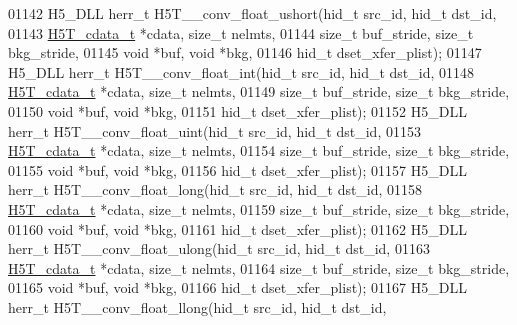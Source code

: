 \begin{DoxyCode}
01142 H5\_DLL herr\_t H5T\_\_conv\_float\_ushort(hid\_t src\_id, hid\_t dst\_id,
01143                      \hyperlink{struct_h5_t__cdata__t}{H5T\_cdata\_t} *cdata, \textcolor{keywordtype}{size\_t} nelmts,
01144                      \textcolor{keywordtype}{size\_t} buf\_stride, \textcolor{keywordtype}{size\_t} bkg\_stride,
01145                                      \textcolor{keywordtype}{void} *buf, \textcolor{keywordtype}{void} *bkg,
01146                                      hid\_t dset\_xfer\_plist);
01147 H5\_DLL herr\_t H5T\_\_conv\_float\_int(hid\_t src\_id, hid\_t dst\_id,
01148                      \hyperlink{struct_h5_t__cdata__t}{H5T\_cdata\_t} *cdata, \textcolor{keywordtype}{size\_t} nelmts,
01149                      \textcolor{keywordtype}{size\_t} buf\_stride, \textcolor{keywordtype}{size\_t} bkg\_stride,
01150                                      \textcolor{keywordtype}{void} *buf, \textcolor{keywordtype}{void} *bkg,
01151                                      hid\_t dset\_xfer\_plist);
01152 H5\_DLL herr\_t H5T\_\_conv\_float\_uint(hid\_t src\_id, hid\_t dst\_id,
01153                      \hyperlink{struct_h5_t__cdata__t}{H5T\_cdata\_t} *cdata, \textcolor{keywordtype}{size\_t} nelmts,
01154                      \textcolor{keywordtype}{size\_t} buf\_stride, \textcolor{keywordtype}{size\_t} bkg\_stride,
01155                                      \textcolor{keywordtype}{void} *buf, \textcolor{keywordtype}{void} *bkg,
01156                                      hid\_t dset\_xfer\_plist);
01157 H5\_DLL herr\_t H5T\_\_conv\_float\_long(hid\_t src\_id, hid\_t dst\_id,
01158                      \hyperlink{struct_h5_t__cdata__t}{H5T\_cdata\_t} *cdata, \textcolor{keywordtype}{size\_t} nelmts,
01159                      \textcolor{keywordtype}{size\_t} buf\_stride, \textcolor{keywordtype}{size\_t} bkg\_stride,
01160                                      \textcolor{keywordtype}{void} *buf, \textcolor{keywordtype}{void} *bkg,
01161                                      hid\_t dset\_xfer\_plist);
01162 H5\_DLL herr\_t H5T\_\_conv\_float\_ulong(hid\_t src\_id, hid\_t dst\_id,
01163                      \hyperlink{struct_h5_t__cdata__t}{H5T\_cdata\_t} *cdata, \textcolor{keywordtype}{size\_t} nelmts,
01164                      \textcolor{keywordtype}{size\_t} buf\_stride, \textcolor{keywordtype}{size\_t} bkg\_stride,
01165                                      \textcolor{keywordtype}{void} *buf, \textcolor{keywordtype}{void} *bkg,
01166                                      hid\_t dset\_xfer\_plist);
01167 H5\_DLL herr\_t H5T\_\_conv\_float\_llong(hid\_t src\_id, hid\_t dst\_id,

\end{DoxyCode}
